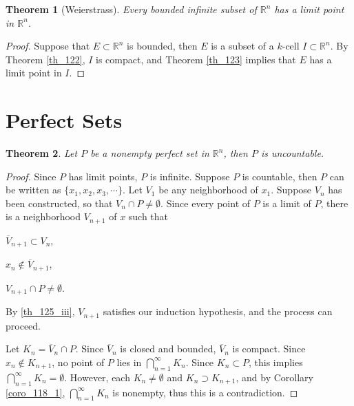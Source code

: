 \documentclass[10pt]{book}
\newtheorem{theorem}{Theorem}[chapter]
\theoremstyle{definition}
\numberwithin{equation}{chapter}
\begin{document}
\medskip

\begin{theorem}[Weierstrass]\label{}
Every bounded infinite subset of $\mathbb{R}^n$ has a limit point in $\mathbb{R}^n$.
\end{theorem}
\begin{proof}
Suppose that $E \subset \mathbb{R}^n$ is bounded, then $E$ is a subset of a $k$-cell $I \subset \mathbb{R}^n$. By Theorem \ref{th_122}, $I$ is compact, and Theorem \ref{th_123} implies that $E$ has a limit point in $I$.
\end{proof}

\medskip



\section{Perfect Sets}

\begin{theorem}\label{th_125}
Let $P$ be a nonempty perfect set in $\mathbb{R}^n$, then $P$ is uncountable.
\end{theorem}
\begin{proof}
Since $P$ has limit points, $P$ is infinite. Suppose $P$ is countable, then $P$ can be written as $\{x_1, x_2, x_3, \cdots\}$. Let $V_1$ be any neighborhood of $x_1$. Suppose $V_n$ has been constructed, so that $V_n \cap P \neq \emptyset$. Since every point of $P$ is a limit of $P$, there is a neighborhood $V_{n+1}$ of $x$ such that \begin{enumerate*}[label=(\roman*)]
    \item $\overline{V}_{n+1} \subset V_n$,
    \item $x_n \notin \overline{V}_{n+1}$,
    \item $V_{n+1} \cap P \neq \emptyset$.\label{th_125_iii}
\end{enumerate*}
By \ref{th_125_iii}, $V_{n+1}$ satisfies our induction hypothesis, and the process can proceed. 

Let $K_n = \overline{V}_{n} \cap P$. Since $\overline{V}_{n}$ is closed and bounded, $\overline{V}_{n}$ is compact. Since $x_n \notin K_{n+1}$, no point of $P$ lies in $\bigcap^\infty_{n=1} K_n$. Since $K_n \subset P$, this implies $\bigcap^\infty_{n=1} K_n = \emptyset$. However, each $K_n \neq \emptyset$ and $K_n \supset K_{n+1}$, and by Corollary \ref{coro_118_1}, $\bigcap^\infty_{n=1} K_n$ is nonempty, thus this is a contradiction.
\end{proof}
\end{document}
